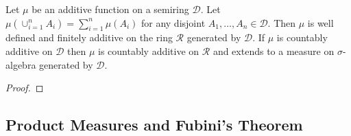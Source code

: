 \begin{lem}Let $\mu$ be an additive function on a semiring $\mathcal{D}$.  Let
  $\mu(\cup_{i=1}^n A_i) = \sum_{i=1}^n \mu(A_i)$ for any disjoint
  $A_1, \dotsc, A_n \in \mathcal{D}$.  Then $\mu$ is well defined and
  finitely additive on
  the ring $\mathcal{R}$ generated by $\mathcal{D}$.  If $\mu$ is
  countably additive on $\mathcal{D}$ then $\mu$ is countably additive
  on $\mathcal{R}$ and extends to a measure on $\sigma$-algebra
  generated by $\mathcal{D}$.
\end{lem}
\begin{proof}
\end{proof}

\subsection{Product Measures and Fubini's Theorem}

